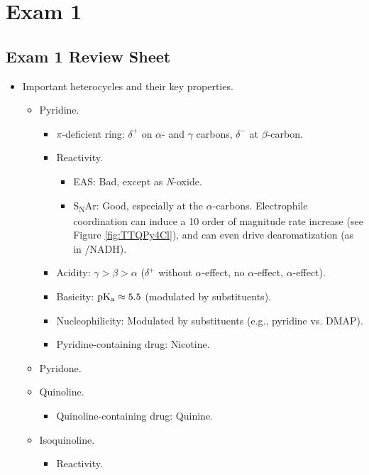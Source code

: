 \documentclass[../notes.tex]{subfiles}
\begin{document}
\chapter{Exam 1}
\section{Exam 1 Review Sheet}
\begin{itemize}
    \item {}Important heterocycles and their key properties.
    \begin{itemize}
        \item Pyridine.
        \begin{itemize}
            \item $\pi$-deficient ring: $\delta^+$ on $\alpha$- and $\gamma$ carbons, $\delta^-$ at $\beta$-carbon.
            \item Reactivity.
            \begin{itemize}
                \item EAS: Bad, except as \emph{N}-oxide.
                \item S\textsubscript{N}Ar: Good, especially at the $\alpha$-carbons. Electrophile coordination can induce a 10 order of magnitude rate increase (see Figure \ref{fig:TTQPy4Cl}), and can even drive dearomatization (as in /NADH).
            \end{itemize}
            \item Acidity: $\gamma>\beta>\alpha$ ($\delta^+$ without $\alpha$-effect, no $\alpha$-effect, $\alpha$-effect).
            \item Basicity: $\operatorname{\text{p}K_\text{a}}\approx 5.5$ (modulated by substituents).
            \item Nucleophilicity: Modulated by substituents (e.g., pyridine vs. DMAP).
            \item Pyridine-containing drug: Nicotine.
        \end{itemize}
        \item Pyridone.
        \item Quinoline.
        \begin{itemize}
            \item Quinoline-containing drug: Quinine.
        \end{itemize}
        \item Isoquinoline.
        \begin{itemize}
            \item Reactivity.
            \begin{itemize}

\end{itemize}
\end{itemize}
\end{itemize}
\end{itemize}
\end{document}
